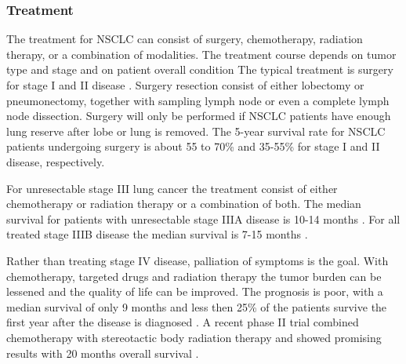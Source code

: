\subsubsection{Treatment}

The treatment for NSCLC can consist of surgery, chemotherapy, radiation therapy, or a combination of modalities. The treatment course depends on tumor type and stage and on patient overall condition
The typical treatment is surgery for stage I and II disease \cite{Tsao2008}. Surgery resection consist of either lobectomy or pneumonectomy, together with sampling lymph node or even a complete lymph node
dissection. Surgery will only be performed if NSCLC patients have enough lung reserve after lobe or lung is removed. The 5-year survival rate for NSCLC patients undergoing surgery is about 55 to 70\% 
and 35-55\% for stage I and II disease, respectively.

For unresectable stage III lung cancer the treatment consist of either chemotherapy or radiation therapy or a combination of both. The median survival for patients with unresectable stage IIIA disease is 10-14 months \cite{Tsao2008}.
For all treated stage IIIB disease the median survival is 7-15 months \cite{Srisam2005}.

Rather than treating stage IV disease, palliation of symptoms is the goal. With chemotherapy, targeted drugs and radiation therapy the tumor burden can be lessened and the quality of life can be improved. The prognosis is poor, with
a median survival of only 9 months and less then 25\% of the patients survive the first year after the disease is diagnosed \cite{Tsao2008}. A recent phase II trial combined chemotherapy with stereotactic body radiation therapy and 
showed promising results with 20 months overall survival \cite{Iyengar2014}.



